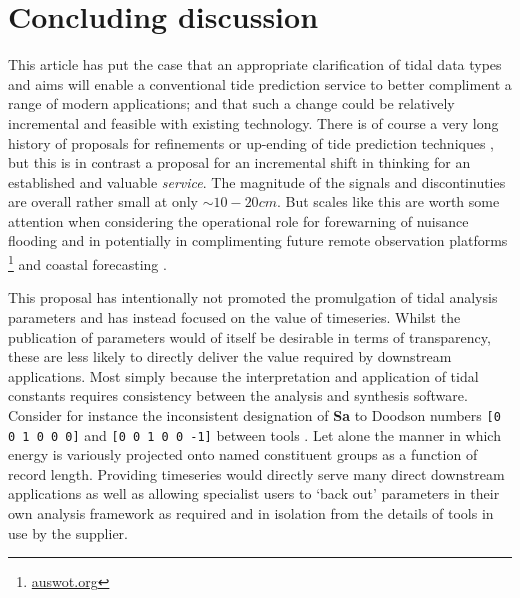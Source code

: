 \section{Concluding discussion}
\label{Sec:Discussion}
This article has put the case that an appropriate clarification of tidal data types and aims will enable a conventional tide prediction service to better compliment a range of modern applications; and that such a change could be relatively incremental and feasible with existing technology. 
There is of course a very long history of proposals for refinements or up-ending of tide prediction techniques \citep{Cartwright:2000tt}\citep{Jay:2003bj}, but this is in contrast a proposal for an incremental shift in thinking for an established and valuable \textit{service}.
The magnitude of the signals and discontinuties are overall rather small at only $\sim10-20cm$.   But scales like this are worth some attention when considering the operational role for forewarning of nuisance flooding \citep{Devlin:2017hu}\citep{10.1071/es19024} and in potentially in complimenting future remote observation platforms \footnote{\url{auswot.org}} and coastal forecasting \citep{10.3389/fmars.2019.00437}.

This proposal has intentionally not promoted the promulgation of tidal analysis parameters and has instead focused on the value of timeseries.   Whilst the publication of parameters would of itself be desirable in terms of transparency, these are less likely to directly deliver the value required by downstream applications.    Most simply because the interpretation and application of tidal constants requires consistency between the analysis and synthesis software. Consider for instance the inconsistent designation of \textbf{Sa} to Doodson numbers \texttt{[0 0 1 0 0 0]} and \texttt{[0 0 1 0 0 ‐1]} between tools \citep{PCTMSL-sp9}.  Let alone the manner in which energy is variously projected onto named constituent groups as a function of record length.  
Providing timeseries would directly serve many direct downstream applications as well as allowing specialist users to `back out' parameters in their own analysis framework as required and in isolation from the details of tools in use by the supplier.
